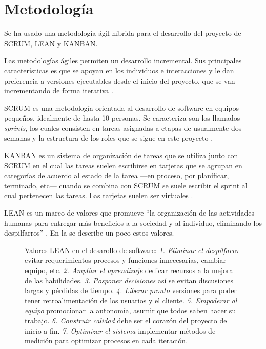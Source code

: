 \section{Metodología}

Se ha usado una metodología ágil híbrida para el desarrollo del proyecto de SCRUM, LEAN y KANBAN.  

Las metodologías ágiles permiten un desarrollo incremental. Sus principales
características es que se apoyan en los individuos e interacciones y le dan preferencia a versiones ejecutables desde el inicio del proyecto, que se van incrementando de forma iterativa \parencite{pmi2017}. 

SCRUM es una metodología orientada al desarrollo de software en equipos pequeños, idealmente de hasta 10 personas. Se caracteriza son los llamados \textit{sprints}, los cuales consisten en tareas asignadas a etapas de usualmente dos semanas y la estructura de los roles que se sigue en este proyecto \parencite{schwaber2020}.

KANBAN es un sistema de organización de tareas que se utiliza junto con SCRUM en el cual las tareas suelen escribirse en tarjetas que se agrupan en categorías de acuerdo al estado de la tarea —en proceso, por planificar, terminado, etc— cuando se combina con SCRUM se suele escribir el sprint al cual pertenecen las tareas. Las tarjetas suelen ser virtuales \parencite{stellman2014}. 

LEAN es un marco de valores que promueve ``la organización de las actividades humanas para entregar más beneficios a la sociedad y al individuo, eliminando los despilfarros'' \parencite{womack2003}. En la  se describe un poco estos valores.

\begin{figure}
    \centering
    \caption[Pensamiento LEAN]{Valores LEAN en el desarollo de software: \textit{1. Eliminar el despilfarro} evitar requerimientos procesos y funciones innecesarias, cambiar equipo, etc. \textit{2. Ampliar el aprendizaje} dedicar recursos a la mejora de las habilidades. \textit{3. Posponer decisiones} así se evitan discusiones largas y pérdidas de tiempo. \textit{4. Liberar pronto} versiones para poder tener retroalimentación de los usuarios y el cliente. \textit{5. Empoderar al equipo} promocionar la autonomía, asumir que todos saben hacer su trabajo. \textit{6. Construir calidad} debe ser el corazón del proyecto de inicio a fin. \textit{7. Optimizar el sistema} implementar métodos de medición para optimizar procesos en cada iteración.}
    \label{fig:penasmientolean}
    
  \end{figure}
  

